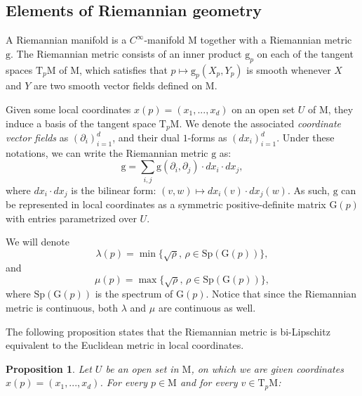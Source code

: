 \documentclass[pdflatex,sn-mathphys-ay]{sn-jnl}%
\newtheorem{proposition}{Proposition}[section]
\newcommand{\man}{\mathrm{M}}
\newcommand{\g}{\mathrm{g}}
\newcommand{\G}{\mathrm{G}}
\newcommand{\tangent}{\mathrm{T}}
\newcommand{\change}[1]{\noindent #1}
\theoremstyle{thmstyleone}%
\begin{document}
\newpage
\begin{appendices}

\section{Elements of Riemannian geometry}
\label{apdx:elemRiem}

A Riemannian manifold is \change{a $C^{\infty}$-manifold $\man$ together with a Riemannian metric $\g$}. The Riemannian metric consists of an \change{inner product} $\g_p$ on each of the tangent spaces $\tangent_p\man$ of $\man$, which satisfies that $p\mapsto\g_p(X_p,Y_p)$ is smooth whenever $X$ and $Y$ are two smooth vector fields defined on $\man$. 

Given some local coordinates $x(p)=(x_1,...,x_d)$ on an open set $U$ of $\man$, 
they induce a basis of the tangent space $\tangent_p\man$. %
We denote the associated {\it coordinate vector fields} as $(\partial_i)_{i=1}^d$, and their dual $1$-forms as $(dx_i)_{i=1}^d$.
Under these notations, we can write the Riemannian metric $\g$ as:
$$\g=\sum_{i,j}\g(\partial_i,\partial_j)\cdot dx_i\cdot dx_j,$$
where $dx_i\cdot dx_j$ is the bilinear form: $(v,w)\mapsto dx_i(v)\cdot dx_j(w).$
As such, $\g$ can be represented in local coordinates as a symmetric positive-definite matrix $\G(p)$ with entries parametrized over $U$.

We will denote
$$\lambda(p)=\min\{\sqrt{\rho},\,\rho\in\mathrm{Sp}(\G(p))\},$$
and
$$\mu(p)=\max\{\sqrt{\rho},\,\rho\in\mathrm{Sp}(\G(p))\},$$
where $\mathrm{Sp}(\G(p))$ is the spectrum of $\G(p)$. Notice that since the Riemannian metric is continuous, both $\lambda$ and $\mu$ are continuous as well.

The following proposition states that the Riemannian metric is bi-Lipschitz equivalent to the Euclidean metric in local coordinates.

\begin{proposition}\label{prop:g_equiv}
Let $U$ be an open set in $\man$, on which we are given coordinates $x(p)=(x_1,...,x_d)$. 
%
For every $p\in\man$ and for every $v\in\tangent_p\man$:


\end{proposition}
\end{appendices}
\end{document}
